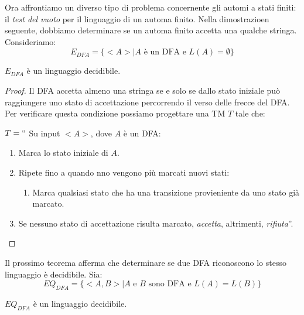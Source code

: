 \documentclass[12pt]{report}
\newcounter{theorem}
\begin{document}
Ora affrontiamo un diverso tipo di problema concernente gli automi a stati finiti: il \textit{test del vuoto} per il linguaggio di un automa finito. Nella dimostrazioen seguente, dobbiamo determinare se un automa finito accetta una qualche stringa. Consideriamo:
\[
E_{DFA} = \{<A> \mid A \text{ è un DFA e } L(A) = \emptyset\}
\]
\begin{theorem}{}{}
$E_{DFA}$ è un linguaggio decidibile.
\end{theorem}
\begin{proof}
	Il DFA accetta almeno una stringa se e solo se dallo stato iniziale può raggiungere uno stato di accettazione percorrendo il verso delle frecce del DFA. Per verificare questa condizione possiamo progettare una TM $T$ tale che:

	$T = ``$ Su input $<A>$, dove $A$ è un DFA:
	\begin{enumerate}
		\item Marca lo stato iniziale di $A$.
		\item Ripete fino a quando nno vengono più marcati nuovi stati:
		\begin{enumerate}
			\item Marca qualsiasi stato che ha una transizione provieniente da uno stato già marcato.
		\end{enumerate}
		\item Se nessuno stato di accettazione risulta marcato, \textit{accetta}, altrimenti, \textit{rifiuta}''.
	\end{enumerate}
\end{proof}
Il prossimo teorema afferma che determinare se due DFA riconoscono lo stesso linguaggio è decidibile. Sia:
\[
EQ_{DFA} = \{<A, B> \mid A \text{ e } B \text{ sono DFA e } L(A) = L(B)\}
\]
\begin{theorem}{}{}
$EQ_{DFA}$ è un linguaggio decidibile.
\end{theorem}
\end{document}
